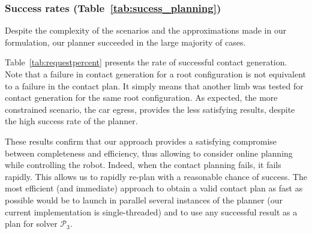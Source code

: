 \subsubsection{Success rates (Table~\ref{tab:sucess_planning})}
Despite the complexity of the scenarios and the approximations made in our formulation, our planner succeeded in the large majority of cases.

Table~\ref{tab:requestpercent} presents the rate of successful contact generation. Note that a failure in contact generation for a root configuration is not equivalent to a failure in the contact plan. It simply means that another limb was tested for contact generation for the same root configuration.
As expected, the more constrained scenario, the car egress, provides the less satisfying results, despite the high success rate of the planner.

These results confirm that our approach provides a satisfying compromise between completeness and efficiency, thus allowing to consider online planning
while controlling the robot. Indeed, when the contact planning fails, it fails rapidly. This allows us to rapidly re-plan with a reasonable chance of success.
The most efficient (and immediate) approach to obtain a valid contact plan as fast as possible would be to launch in parallel several instances of the planner (our current implementation is single-threaded) and to use any successful result as a plan for solver $\mathcal{P}_3$.


